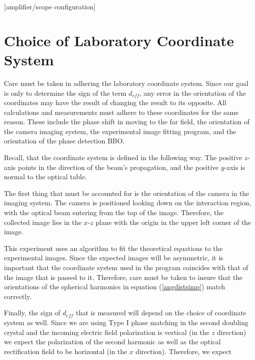 [amplifier/scope configuration]

\section{Choice of Laboratory Coordinate System}

Care must be taken in adhering the laboratory coordinate system.
Since our goal is only to determine the sign of the term
$d_{eff}$, any error in the orientation of the coordinates may
have the result of changing the result to its opposite.  All
calculations and measurements must adhere to these coordinates for
the same reason. These include the phase shift in moving to the
far field, the orientation of the camera imaging system, the
experimental image fitting program, and the orientation of the
phase detection BBO.

Recall, that the coordinate system is defined in the following
way. The positive $z$-axis points in the direction of the beam's
propagation, and the positive $y$-axis is normal to the optical
table.

The first thing that must be accounted for is the orientation of
the camera in the imaging system.  The camera is positioned
looking down on the interaction region, with the optical beam
entering from the top of the image.  Therefore, the collected
image lies in the $x$-$z$ plane with the origin in the upper left corner of the image.  



This experiment uses an algorithm to fit the theoretical equations
to the experimental images.  Since the expected images will be
asymmetric, it is important that the coordinate system used in the
program coincides with that of the image that is passed to it.
Therefore, care must be taken to insure that the orientations of
the spherical harmonics in equation (\ref{angdistsimp}) match
correctly.

Finally, the sign of $d_{eff}$ that is measured will depend on the
choice of coordinate system as well.  Since we are using Type I
phase matching in the second doubling crystal and the incoming
electric field polarization is vertical (in the $z$ direction) we
expect the polarization of the second harmonic as well as the
optical rectification field to be horizontal (in the $x$
direction).  Therefore, we expect

